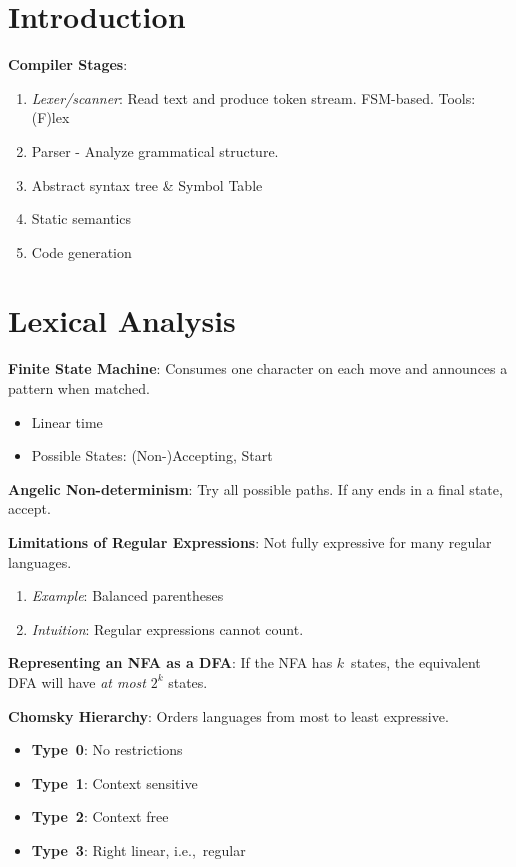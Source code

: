 \documentclass[10pt]{report}
\begin{document}
  \begin{multicols}{2}
    \section{Introduction}
    
    \textbf{Compiler Stages}:
    \begin{enumerate}
      \item \textit{Lexer/scanner}: Read text and produce token stream. FSM-based.  Tools: (F)lex
      \item Parser - Analyze grammatical structure.
      \item Abstract syntax tree \& Symbol Table
      \item Static semantics
      \item Code generation
    \end{enumerate}
  
    \section{Lexical Analysis}
    
    \textbf{Finite State Machine}: Consumes one character on each move and announces a pattern when matched.
    \begin{itemize}
      \item Linear time
      \item Possible States: (Non-)Accepting, Start
    \end{itemize}
  
    \textbf{Angelic Non-determinism}: Try all possible paths. If any ends in a final state, accept.
    
    \textbf{Limitations of Regular Expressions}: Not fully expressive for many regular languages.
    \begin{enumerate}
      \item \textit{Example}: Balanced parentheses
      \item \textit{Intuition}: Regular expressions cannot count.
    \end{enumerate}
  
    \textbf{Representing an NFA as a DFA}: If the NFA has $k$~states, the equivalent DFA will have \textit{at most} $2^{k}$ states.
    
    
    \textbf{Chomsky Hierarchy}: Orders languages from most to least expressive.
    \begin{itemize}
      \item \textbf{Type~0}: No restrictions
      \item \textbf{Type~1}: Context sensitive
      \item \textbf{Type~2}: Context free
      \item \textbf{Type~3}: Right linear, i.e.,~regular
    \end{itemize}
    

\end{multicols}
\end{document}
